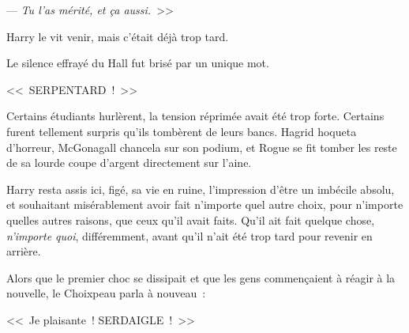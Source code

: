 --- \emph{Tu l'as mérité, et ça aussi.}~>>

Harry le vit venir, mais c'était déjà trop tard.

Le silence effrayé du Hall fut brisé par un unique mot.

<<~SERPENTARD~!~>>

Certains étudiants hurlèrent, la tension réprimée avait été trop forte. Certains furent tellement surpris qu'ils tombèrent de leurs bancs. Hagrid hoqueta d'horreur, McGonagall chancela sur son podium, et Rogue se fit tomber les reste de sa lourde coupe d'argent directement sur l'aine.

Harry resta assis ici, figé, sa vie en ruine, l'impression d'être un imbécile absolu, et souhaitant misérablement avoir fait n'importe quel autre choix, pour n'importe quelles autres raisons, que ceux qu'il avait faits. Qu'il ait fait quelque chose, \emph{n'importe quoi}, différemment, avant qu'il n'ait été trop tard pour revenir en arrière.

Alors que le premier choc se dissipait et que les gens commençaient à réagir à la nouvelle, le Choixpeau parla à nouveau~:

<<~Je plaisante~! SERDAIGLE~!~>>
